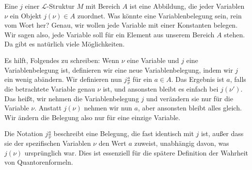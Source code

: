\begin{spoken-clean}[00:50:35 - 00:53:05]
Eine  $j$ einer $\mathcal{L}$-Struktur $M$ mit Bereich $A$ ist eine Abbildung, die jeder Variablen $\nu$ ein Objekt $j(\nu) \in A$ zuordnet. Was könnte eine Variablenbelegung sein, rein vom Wort her? Genau, wir wollen jede Variable mit einer Konstanten belegen. Wir sagen also, jede Variable soll für ein Element aus unserem Bereich $A$ stehen. Da gibt es natürlich viele Möglichkeiten.

Es hilft, Folgendes zu schreiben: Wenn $\nu$ eine Variable und $j$ eine Variablenbelegung ist, definieren wir eine neue Variablenbelegung, indem wir $j$ ein wenig abändern. Wir definieren nun $j \frac{a}{\nu}$ für ein $a \in A$. Das Ergebnis ist $a$, falls die betrachtete Variable genau $\nu$ ist, und ansonsten bleibt es einfach bei $j(\nu')$. Das heißt, wir nehmen die Variablenbelegung $j$ und verändern sie nur für die Variable $\nu$. Anstatt $j(\nu)$ nehmen wir nun $a$, aber ansonsten bleibt alles gleich. Wir ändern die Belegung also nur für eine einzige Variable.
\end{spoken-clean}

\begin{math-stroke}[Variablenbelegung]


\begin{explanation-of-steps}
Die Notation $j \frac{a}{\nu}$ beschreibt eine Belegung, die fast identisch mit $j$ ist, außer dass sie der spezifischen Variablen $\nu$ den Wert $a$ zuweist, unabhängig davon, was $j(\nu)$ ursprünglich war. Dies ist essenziell für die spätere Definition der Wahrheit von Quantorenformeln.
\end{explanation-of-steps}
\end{math-stroke}


